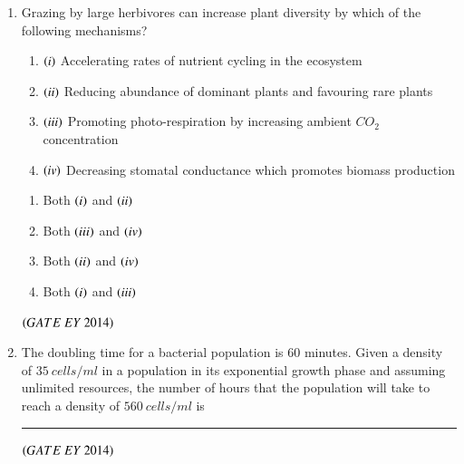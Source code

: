 \documentclass[journal]{IEEEtran}
\numberwithin{equation}{enumi}
\numberwithin{figure}{enumi}
\begin{document}
\begin{enumerate}
    \item Grazing by large herbivores can increase plant diversity by which of the following mechanisms?
    \begin{enumerate}
        \item $\left(i\right)$ Accelerating rates of nutrient cycling in the ecosystem
        \item $\left(ii\right)$ Reducing abundance of dominant plants and favouring rare plants
        \item $\left(iii\right)$ Promoting photo-respiration by increasing ambient $CO_{2}$ concentration
        \item $\left(iv\right)$ Decreasing stomatal conductance which promotes biomass production
    \end{enumerate}
    \begin{multicols}{2}
    \begin{enumerate}
        \item Both $\left(i\right)$ and $\left(ii\right)$
        \item Both $\left(iii\right)$ and $\left(iv\right)$
        \item Both $\left(ii\right)$ and $\left(iv\right)$
        \item Both $\left(i\right)$ and $\left(iii\right)$
    \end{enumerate}
    \end{multicols}
    \hfill{$\brak{ GATE\ EY\ 2014}$}
    \bigskip

    \item The doubling time for a bacterial population is $60$ minutes. Given a density of $35~cells/ml$ in a population in its exponential growth phase and assuming unlimited resources, the number of hours that the population will take to reach a density of $560~cells/ml$ is \rule{3cm}{0.15mm}
    \hfill{$\brak{ GATE\ EY\ 2014}$}
    \bigskip

\end{enumerate}
\end{document}
